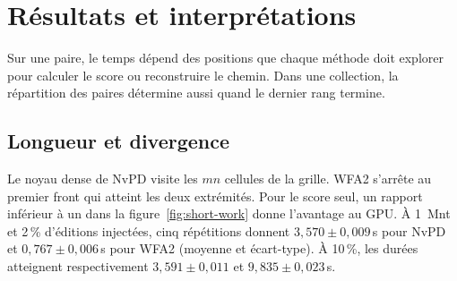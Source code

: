 \section{Résultats et interprétations}
Sur une paire, le temps dépend des positions que chaque méthode doit explorer pour calculer le score ou reconstruire le chemin. Dans une collection, la répartition des paires détermine aussi quand le dernier rang termine.
\subsection{Longueur et divergence}
Le noyau dense de NvPD visite les \(mn\) cellules de la grille. WFA2 s’arrête au premier front qui atteint les deux extrémités. Pour le score seul, un rapport inférieur à un dans la figure~\ref{fig:short-work} donne l’avantage au GPU.
À 1~Mnt et 2\,\% d’éditions injectées, cinq répétitions donnent \(3{,}570\pm0{,}009\)\,s pour NvPD et \(0{,}767\pm0{,}006\)\,s pour WFA2 (moyenne et écart-type). À 10\,\%, les durées atteignent respectivement \(3{,}591\pm0{,}011\) et \(9{,}835\pm0{,}023\)\,s.


